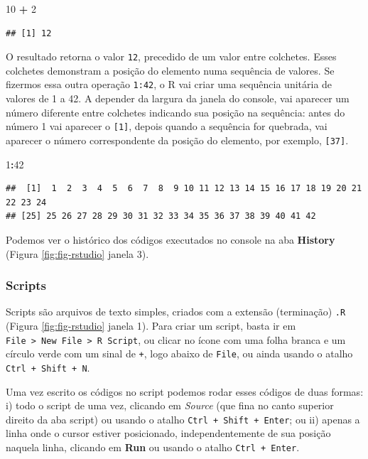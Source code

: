 \documentclass[
]{article}
\newenvironment{Shaded}{\begin{snugshade}}{\end{snugshade}}
\newcommand{\DecValTok}[1]{\textcolor[rgb]{0.00,0.00,0.81}{#1}}
\newcommand{\SpecialCharTok}[1]{\textcolor[rgb]{0.81,0.36,0.00}{\textbf{#1}}}
\begin{document}
\begin{Shaded}
\begin{Highlighting}[]
\DecValTok{10} \SpecialCharTok{+} \DecValTok{2}
\end{Highlighting}
\end{Shaded}

\begin{verbatim}
## [1] 12
\end{verbatim}

O resultado retorna o valor \texttt{12}, precedido de um valor entre colchetes. Esses colchetes demonstram a posição do elemento numa sequência de valores. Se fizermos essa outra operação \texttt{1:42}, o R vai criar uma sequência unitária de valores de 1 a 42. A depender da largura da janela do console, vai aparecer um número diferente entre colchetes indicando sua posição na sequência: antes do número 1 vai aparecer o \texttt{{[}1{]}}, depois quando a sequência for quebrada, vai aparecer o número correspondente da posição do elemento, por exemplo, \texttt{{[}37{]}}.

\begin{Shaded}
\begin{Highlighting}[]
\DecValTok{1}\SpecialCharTok{:}\DecValTok{42}
\end{Highlighting}
\end{Shaded}

\begin{verbatim}
##  [1]  1  2  3  4  5  6  7  8  9 10 11 12 13 14 15 16 17 18 19 20 21 22 23 24
## [25] 25 26 27 28 29 30 31 32 33 34 35 36 37 38 39 40 41 42
\end{verbatim}

Podemos ver o histórico dos códigos executados no console na aba \textbf{History} (Figura \ref{fig:fig-rstudio} janela 3).

\hypertarget{scripts}{%
\subsubsection{Scripts}\label{scripts}}

Scripts são arquivos de texto simples, criados com a extensão (terminação) \texttt{.R} (Figura \ref{fig:fig-rstudio} janela 1). Para criar um script, basta ir em \texttt{File\ \textgreater{}\ New\ File\ \textgreater{}\ R\ Script}, ou clicar no ícone com uma folha branca e um círculo verde com um sinal de \texttt{+}, logo abaixo de \texttt{File}, ou ainda usando o atalho \texttt{Ctrl\ +\ Shift\ +\ N}.

Uma vez escrito os códigos no script podemos rodar esses códigos de duas formas: i) todo o script de uma vez, clicando em \emph{Source} (que fina no canto superior direito da aba script) ou usando o atalho \texttt{Ctrl\ +\ Shift\ +\ Enter}; ou ii) apenas a linha onde o cursor estiver posicionado, independentemente de sua posição naquela linha, clicando em \textbf{Run} ou usando o atalho \texttt{Ctrl\ +\ Enter}.
\end{document}
